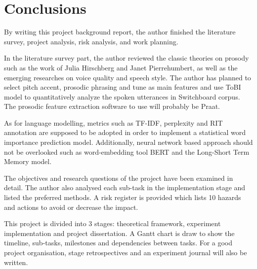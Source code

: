 \chapter{Conclusions}

By writing this project background report, the author finished the literature survey, project analysis, risk analysis, and work planning.

In the literature survey part, the author reviewed the classic theories on prosody such as the work of Julia Hirschberg and Janet Pierrehumbert, as well as the emerging researches on voice quality and speech style. The author has planned to select pitch accent, prosodic phrasing and tune as main features and use ToBI model to quantitatively analyze the spoken utterances in Switchboard corpus. The prosodic feature extraction software to use will probably be Praat. 

As for language modelling, metrics such as TF-IDF, perplexity and RIT annotation are supposed to be adopted in order to implement a statistical word importance prediction model. Additionally, neural network based approach should not be overlooked such as word-embedding tool BERT and the Long-Short Term Memory model.

The objectives and research questions of the project have been examined in detail.  The author also analysed each sub-task in the implementation stage and listed the preferred methods. A risk register is provided which lists 10 hazards and actions to avoid or decrease the impact.

This project is divided into 3 stages: theoretical framework, experiment implementation and project dissertation. A  Gantt chart is draw to show the timeline, sub-tasks, milestones and dependencies between tasks. For a good project organisation, stage retrospectives and an experiment journal will also be written.